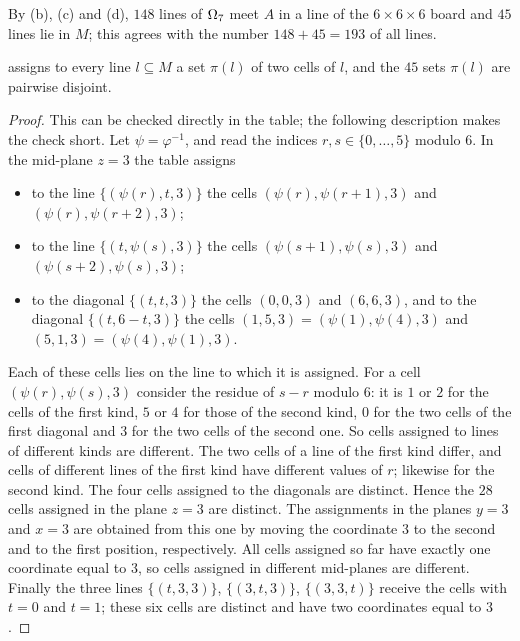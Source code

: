 By (b), (c) and (d), $148$ lines of $\Omega_7$ meet $A$ in a line of the $6\times6\times6$ board and $45$
lines lie in $M$; this agrees with the number $148+45=193$ of all lines.

\begin{lemma}\label{lem:seven-pairing}
 assigns to every line $l\subseteq M$ a set $\pi(l)$ of two cells of
$l$, and the $45$ sets $\pi(l)$ are pairwise disjoint.
\end{lemma}

\begin{proof}
This can be checked directly in the table; the following description makes the check short. Let
$\psi=\varphi^{-1}$, and read the indices $r,s\in\{0,\dots,5\}$ modulo $6$. In the mid-plane $z=3$ the
table assigns
\begin{itemize}
\item to the line $\{(\psi(r),t,3)\}$ the cells $(\psi(r),\psi(r+1),3)$ and $(\psi(r),\psi(r+2),3)$;
\item to the line $\{(t,\psi(s),3)\}$ the cells $(\psi(s+1),\psi(s),3)$ and $(\psi(s+2),\psi(s),3)$;
\item to the diagonal $\{(t,t,3)\}$ the cells $(0,0,3)$ and $(6,6,3)$, and to the diagonal
      $\{(t,6-t,3)\}$ the cells $(1,5,3)=(\psi(1),\psi(4),3)$ and $(5,1,3)=(\psi(4),\psi(1),3)$.
\end{itemize}
Each of these cells lies on the line to which it is assigned. For a cell $(\psi(r),\psi(s),3)$ consider
the residue of $s-r$ modulo $6$: it is $1$ or $2$ for the cells of the first kind, $5$ or $4$ for those
of the second kind, $0$ for the two cells of the first diagonal and $3$ for the two cells of the second
one. So cells assigned to lines of different kinds are different. The two cells of a line of the first
kind differ, and cells of different lines of the first kind have different values of $r$; likewise for
the second kind. The four cells assigned to the diagonals are distinct. Hence the $28$ cells assigned
in the plane $z=3$ are distinct. The assignments in the planes $y=3$ and $x=3$ are obtained from this
one by moving the coordinate $3$ to the second and to the first position, respectively. All cells
assigned so far have exactly one coordinate equal to $3$, so cells assigned in different mid-planes are
different. Finally the three lines $\{(t,3,3)\}$, $\{(3,t,3)\}$, $\{(3,3,t)\}$ receive the cells with
$t=0$ and $t=1$; these six cells are distinct and have two coordinates equal to $3$.
\end{proof}

